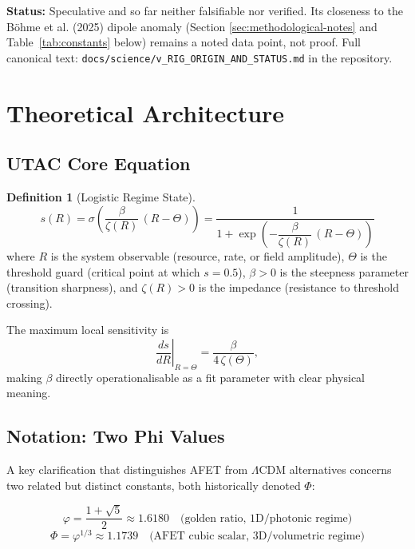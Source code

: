\documentclass[12pt,a4paper]{article}
\theoremstyle{definition}
\newtheorem{definition}{Definition}
\newcommand{\phigold}{\varphi}   %
\newcommand{\PhiAFET}{\Phi}      %
\begin{document}
\textbf{Status:} Speculative and so far neither falsifiable nor verified.
Its closeness to the B\"ohme et al. (2025) dipole anomaly (Section
\ref{sec:methodological-notes} and Table~\ref{tab:constants} below)
remains a noted data point, not proof. Full canonical text:
\texttt{docs/science/v\_RIG\_ORIGIN\_AND\_STATUS.md} in the repository.

\section{Theoretical Architecture}

\subsection{UTAC Core Equation}

\begin{definition}[Logistic Regime State]
\begin{equation}
  s(R) = \sigma\!\left(\frac{\beta}{\zeta(R)}\,(R - \Theta)\right)
       = \frac{1}{1 + \exp\!\left(-\dfrac{\beta}{\zeta(R)}\,(R-\Theta)\right)}
  \label{eq:utac}
\end{equation}
where $R$ is the system observable (resource, rate, or field amplitude),
$\Theta$ is the threshold guard (critical point at which $s=0.5$),
$\beta > 0$ is the steepness parameter (transition sharpness),
and $\zeta(R) > 0$ is the impedance (resistance to threshold crossing).
\end{definition}

The maximum local sensitivity is
\begin{equation}
  \left.\frac{ds}{dR}\right|_{R=\Theta} = \frac{\beta}{4\,\zeta(\Theta)},
\end{equation}
making $\beta$ directly operationalisable as a fit parameter with clear physical meaning.

\subsection{Notation: Two Phi Values}

A key clarification that distinguishes AFET from $\Lambda$CDM alternatives
concerns two related but distinct constants, both historically denoted $\Phi$:

\begin{equation}
  \phigold = \frac{1+\sqrt{5}}{2} \approx 1.6180\quad\text{(golden ratio, 1D/photonic regime)}
\end{equation}
\begin{equation}
  \PhiAFET = \phigold^{1/3} \approx 1.1739\quad\text{(AFET cubic scalar, 3D/volumetric regime)}
\end{equation}
\end{document}
